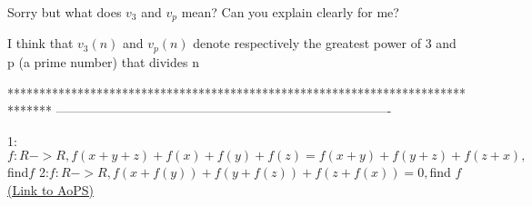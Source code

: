 \begin{solution}
	Sorry but what does $v_{3}$  and  $v_{p}$ mean? Can you explain clearly for me?
\end{solution}



\begin{solution}
	I think that $ v_{3}(n) $ and $ v_{p}(n) $ denote respectively the greatest power of 3 and p (a prime number) that divides n
\end{solution}
*******************************************************************************
-------------------------------------------------------------------------------

\begin{problem}
	1:$f:R->R,f(x+y+z)+f(x)+f(y)+f(z)=f(x+y)+f(y+z)+f(z+x),$find$ f$
2:$f:R->R,f(x+f(y))+f(y+f(z))+f(z+f(x))=0,$find $f$
	\flushright \href{https://artofproblemsolving.com/community/c6h542527}{(Link to AoPS)}
\end{problem}



